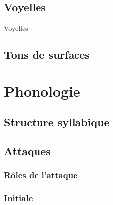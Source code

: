 \documentclass[11pt, a4paper]{book}              %
\begin{document}
\section{Voyelles}
\renewcommand\textipa[1]{{\fontfamily{cmr}\tipaencoding #1}}
\begin{table}[H]
\caption{Voyelles}
\label{voyelles}
\centering
{\Large
\begin{vowel}
\end{vowel}
}

\end{table}

\section{Tons de surfaces}

\chapter{Phonologie}
\section{Structure syllabique}
\section{Attaques}
\subsection{Rôles de l'attaque}
\subsection{Initiale}
\end{document}
